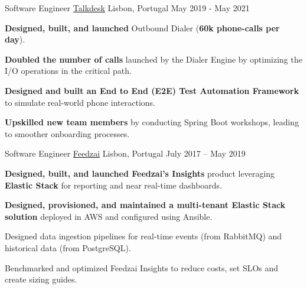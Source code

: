 \begin{cventries}
  \cventry
    {Software Engineer}
    {\href{https://www.talkdesk.com/}{Talkdesk}}
    {Lisbon, Portugal}
    {May 2019 - May 2021}
    {
      \begin{cvitems}
        \item \textbf{Designed, built, and launched} Outbound Dialer (\textbf{60k phone-calls per day}).
        \item \textbf{Doubled the number of calls} launched by the Dialer Engine by optimizing the I/O operations in the critical path.
        \item \textbf{Designed and built an End to End (E2E) Test Automation Framework} to simulate real-world phone interactions.
        \item \textbf{Upskilled new team members} by conducting Spring Boot workshops, leading to smoother onboarding processes.
      \end{cvitems}
      \vspace{4mm}
    }

    
  \cventry
    {Software Engineer}
    {\href{https://feedzai.com/}{Feedzai}}
    {Lisbon, Portugal}
    {July 2017 – May 2019}
    {
      \begin{cvitems}
        \item \textbf{Designed, built, and launched Feedzai's Insights} product leveraging \textbf{Elastic Stack} for reporting and near real-time dashboards.
        \item \textbf{Designed, provisioned, and maintained a multi-tenant Elastic Stack solution} deployed in AWS and configured using Ansible.
        \item Designed data ingestion pipelines for real-time events (from RabbitMQ) and historical data (from PostgreSQL).
        \item Benchmarked and optimized Feedzai Insights to reduce costs, set SLOs and create sizing guides.
      \end{cvitems}
      \vspace{4mm}
    }


\end{cventries}
